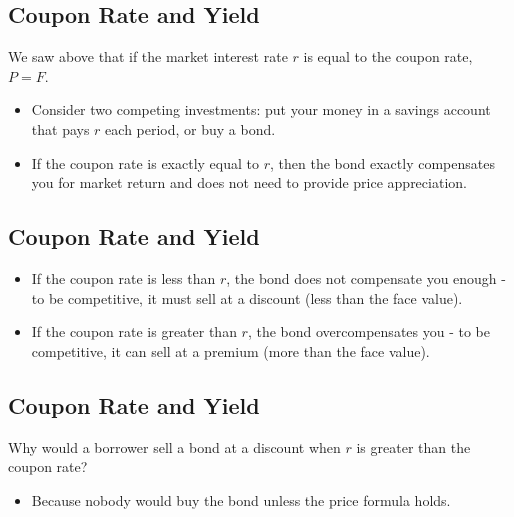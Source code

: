 \documentclass[letterpaper,10pt,english]{sphinxmanual}
\begin{document}
\subsection{Coupon Rate and Yield}
\label{bondPrices:coupon-rate-and-yield}
We saw above that if the market interest rate $r$ is equal to
the coupon rate, $P = F$.
\begin{itemize}
\item {} 
Consider two competing investments: put your money in a savings
account that pays $r$ each period, or buy a bond.

\end{itemize}
\begin{itemize}
\item {} 
If the coupon rate is exactly equal to $r$, then the bond
exactly compensates you for market return and does not need to
provide price appreciation.

\end{itemize}


\subsection{Coupon Rate and Yield}
\label{bondPrices:id12}\begin{itemize}
\item {} 
If the coupon rate is less than $r$, the bond does not
compensate you enough - to be competitive, it must sell at a
discount (less than the face value).

\end{itemize}
\begin{itemize}
\item {} 
If the coupon rate is greater than $r$, the bond
overcompensates you - to be competitive, it can sell at a premium
(more than the face value).

\end{itemize}


\subsection{Coupon Rate and Yield}
\label{bondPrices:id13}
Why would a borrower sell a bond at a discount when $r$ is
greater than the coupon rate?
\begin{itemize}
\item {} 
Because nobody would buy the bond unless the price formula holds.

\end{itemize}
\end{document}
